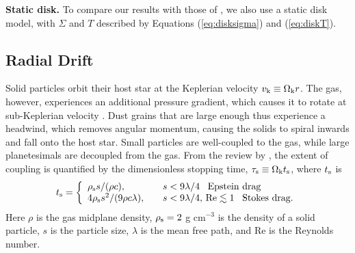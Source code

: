 \documentclass[apj]{emulateapj}
\begin{document}



\textbf{Static disk.} To compare our results with those of \citet{oberg11}, we also use a static disk model, with $\Sigma$ and $T$ described by Equations (\ref{eq:disksigma}) and (\ref{eq:diskT}). %


\subsection{Radial Drift}
\label{sec:drift}

Solid particles orbit their host star at the Keplerian velocity $v_{\rm k} \equiv \Omega_{\rm k} r$. The gas, however, experiences an additional pressure gradient, which causes it to rotate at sub-Keplerian velocity \citep{weidenschilling77}. Dust grains that are large enough thus experience a headwind, which removes angular momentum, causing the solids to spiral inwards and fall onto the host star. Small particles are well-coupled to the gas, while large planetesimals are decoupled from the gas. From the review by \citet{chiang10}, the extent of coupling is quantified by the dimensionless stopping time, $\tau_{\rm s} \equiv \Omega_{\rm k} t_{\rm s}$, where $t_{\rm s}$ is
\begin{equation}
\label{eq:ts}
t_{\rm s}= \left\{
\begin{array}{l l}
\rho_{\rm s} s / (\rho c), & \quad s < 9 \lambda/4 \,\,\,\ \text{Epstein drag} \\
4 \rho_{\rm s} s^2 / (9 \rho c \lambda), & \quad s < 9 \lambda/4, \,\text{Re} \lesssim 1 \,\,\,\ \text{Stokes drag.}
\end{array} 
\right.
\end{equation}
Here $\rho$ is the gas midplane density, $\rho_{\rm s}=2$ g cm$^{-3}$ is the density of a solid particle, $s$ is the particle size, $\lambda$ is the mean free path, and Re is the Reynolds number. 
\end{document}
